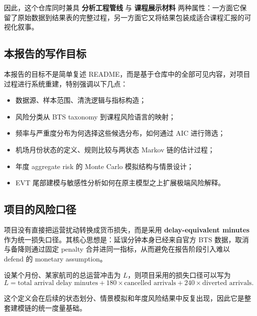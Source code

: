 因此，这个仓库同时兼具 \textbf{分析工程管线} 与 \textbf{课程展示材料} 两种属性：一方面它保留了原始数据到结果表的完整过程，另一方面它又将结果包装成适合课程汇报的可视化叙事。

\subsection{本报告的写作目标}

本报告的目标不是简单复述 README，而是基于仓库中的全部可见内容，对项目过程进行系统重建，特别强调以下几点：
\begin{itemize}[leftmargin=2.2em]
  \item 数据源、样本范围、清洗逻辑与指标构造；
  \item 风险分类从 BTS taxonomy 到课程风险语言的映射；
  \item 频率与严重度分布为何选择这些候选分布，如何通过 AIC 进行筛选；
  \item 机场月份状态的定义、规则比较与两状态 Markov 链的估计过程；
  \item 年度 aggregate risk 的 Monte Carlo 模拟结构与情景设计；
  \item EVT 尾部建模与敏感性分析如何在原主模型之上扩展极端风险解释。
\end{itemize}

\subsection{项目的风险口径}

项目没有直接把运营扰动转换成货币损失，而是采用 \textbf{delay-equivalent minutes} 作为统一损失口径。其核心思想是：延误分钟本身已经来自官方 BTS 数据，取消与备降则通过固定 penalty 合并进同一指标，从而避免在报告阶段引入难以 defend 的 monetary assumption。

设某个月份、某家航司的总运营冲击为 $L$，则项目采用的损失口径可以写为
\begin{equation}
L = \text{total arrival delay minutes}
  + 180 \times \text{cancelled arrivals}
  + 240 \times \text{diverted arrivals}.
\label{eq:delay-equivalent-loss}
\end{equation}

这个定义会在后续的状态划分、情景模拟和年度风险结果中反复出现，因此它是整套建模链的统一度量基础。
